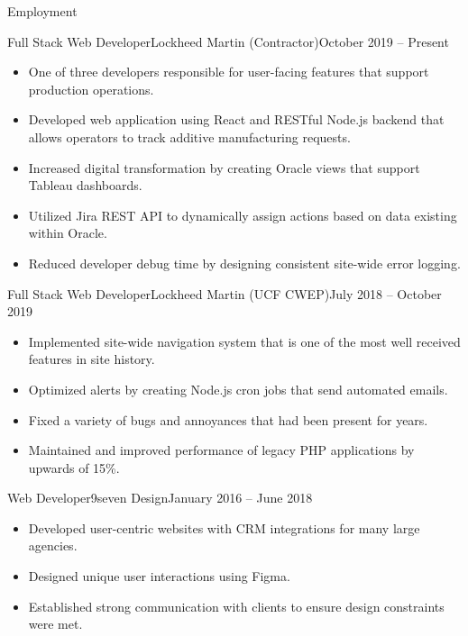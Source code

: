 \documentclass[calibri]{mcdowellcv}
\begin{document}
	\makeheader
	
	\begin{cvsection}{Employment}
		\begin{cvsubsection}{Full Stack Web Developer}{Lockheed Martin (Contractor)}{October 2019 -- Present}		
			\begin{itemize}
				\item One of three developers responsible for user-facing features that support production operations.
				\item Developed web application using React and RESTful Node.js backend that allows operators to track additive manufacturing requests.
				\item Increased digital transformation by creating Oracle views that support Tableau dashboards.
				\item Utilized Jira REST API to dynamically assign actions based on data existing within Oracle.
				\item Reduced developer debug time by designing consistent site-wide error logging.
			\end{itemize}
		\end{cvsubsection}
		
		\begin{cvsubsection}{Full Stack Web Developer}{Lockheed Martin (UCF CWEP)}{July 2018 -- October 2019}	
			\begin{itemize}
				\item Implemented site-wide navigation system that is one of the most well received features in site history.
				\item Optimized alerts by creating Node.js cron jobs that send automated emails.
				\item Fixed a variety of bugs and annoyances that had been present for years.
				\item Maintained and improved performance of legacy PHP applications by upwards of 15\%.
			\end{itemize}
		\end{cvsubsection}
		
		\begin{cvsubsection}{Web Developer}{9seven Design}{January 2016 -- June 2018}		
			\begin{itemize}
				\item Developed user-centric websites with CRM integrations for many large agencies.
				\item Designed unique user interactions using Figma.
				\item Established strong communication with clients to ensure design constraints were met.
			\end{itemize}
		\end{cvsubsection}
	\end{cvsection}
	
\end{document}
